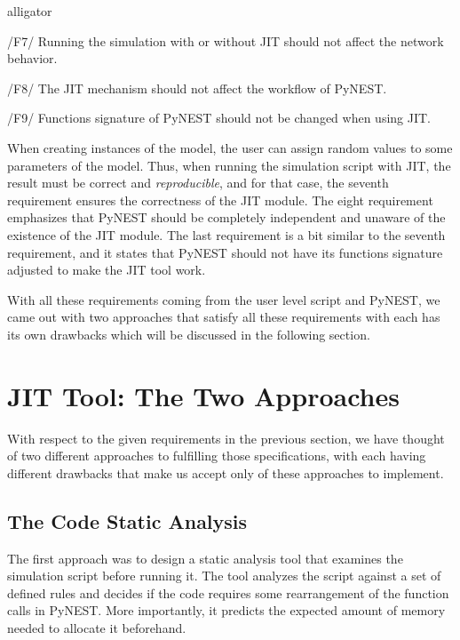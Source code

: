 \begin{labeling}{alligator}
   \item  [/F7/] Running the simulation with or without JIT should not affect the network behavior.\\
   
     
   \item [/F8/] The JIT mechanism should not affect the workflow of PyNEST.\\
   
   \item  [/F9/] Functions signature of PyNEST should not be changed when using JIT.\\

\end{labeling}

When creating instances of the model, the user can assign random values to some parameters of the model. Thus, when running the simulation script with JIT, the result must be correct and \emph{reproducible}, and for that  case, the seventh requirement ensures the correctness of the JIT module. The eight requirement emphasizes that PyNEST should be completely independent and unaware of the existence of the JIT module. The last requirement is a bit similar to the seventh requirement, and it states that  PyNEST  should not have its functions signature adjusted to make the JIT tool work.


With all these requirements coming from the user level script and PyNEST, we came out with two approaches that satisfy all these requirements with each has its own drawbacks which will be discussed in the following section.

\section{JIT Tool: The Two Approaches}

With respect to the given requirements in the previous section, we have thought of two different approaches to fulfilling those specifications, with each having different drawbacks that make us accept only of these approaches to implement.

\subsection{The Code Static Analysis}

The first approach was to design a static analysis tool that examines the simulation script before running it. The tool analyzes the script against a set of defined rules and decides if the code requires some rearrangement of the function calls in PyNEST. More importantly, it predicts the expected amount of memory needed to allocate it beforehand. 


